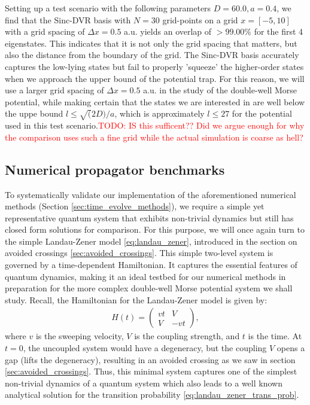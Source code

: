 \documentclass{subfiles}
\begin{document}
Setting up a test scenario with the following parameters $D = 60.0, a = 0.4$, we find that the Sinc-DVR basis with $N=30$ grid-points on a grid $x = [-5, 10]$ with a grid spacing of $\Delta x = 0.5$ a.u. yields an overlap of $>99.00\%$ for the first 4 eigenstates. This indicates that it is not only the grid spacing that matters, but also the distance from the boundary of the grid. The Sinc-DVR basis accurately captures the low-lying states but fail to properly 'squeeze' the higher-order states when we approach the upper bound of the potential trap. For this reason, we will use a larger grid spacing of $\Delta x = 0.5$ a.u. in the study of the double-well Morse potential, while making certain that the states we are interested in are well below the uppe bound $l \leq \sqrt(2D)/a$, which is approximately $l \leq 27$ for the potential used in this test scenario.\textcolor{red}{TODO: IS this sufficent?? Did we argue enough for why the comparison uses such a fine grid while the actual simulation is coarse as hell?}


\subsection{Numerical propagator benchmarks}
To systematically validate our implementation of the aforementioned numerical methods (Section \ref{sec:time_evolve_methods}), we require a simple yet representative quantum system that exhibits non-trivial dynamics but still has closed form solutions for comparison. For this purpose, we will once again turn to the simple Landau-Zener model \eqref{eq:landau_zener}, introduced in the section on avoided crossings \ref{sec:avoided_crossings}. This simple two-level system is governed by a time-dependent Hamiltonian. It captures the essential features of quantum dynamics, making it an ideal testbed for our numerical methods in preparation for the more complex double-well Morse potential system we shall study.
Recall, the Hamiltonian for the Landau-Zener model is given by:
\begin{align*}
    H(t) = \begin{pmatrix}
        vt & V \\
        V & -vt
\end{pmatrix},
\end{align*}
where $v$ is the sweeping velocity, $V$ is the coupling strength, and $t$ is the time. At $t=0$, the uncoupled system would have a degeneracy, but the coupling $V$ opens a gap (lifts the degeneracy), resulting in an avoided crossing as we saw in section \ref{sec:avoided_crossings}. Thus, this minimal system captures one of the simplest non-trivial dynamics of a quantum system which also leads to a well known analytical solution for the transition probability \eqref{eq:landau_zener_trans_prob}. 
\end{document}
